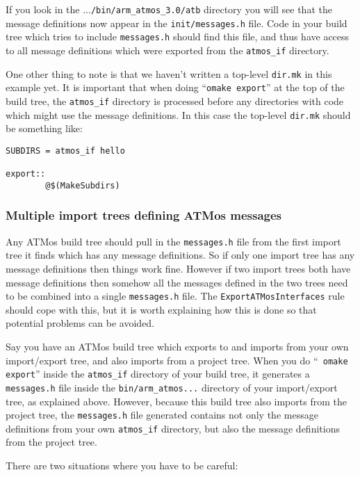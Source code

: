 \documentclass[11pt,twoside,onecolumn]{article}
\begin{document}
If you look in the ...\verb|/bin/arm_atmos_3.0/atb| directory you will see that
the message definitions now appear in the \verb|init/messages.h| file.  Code in
your build tree which tries to include \verb|messages.h| should find this file,
and thus have access to all message definitions which were exported from the
\verb|atmos_if| directory.

One other thing to note is that we haven't written a top-level {\tt dir.mk} in
this example yet.  It is important that when doing ``{\tt omake export}'' at
the top of the build tree, the \verb|atmos_if| directory is processed before
any directories with code which might use the message definitions.  In this
case the top-level {\tt dir.mk} should be something like:

{\small \begin{verbatim}
SUBDIRS = atmos_if hello

export::
        @$(MakeSubdirs)
\end{verbatim}}

\subsubsection{Multiple import trees defining ATMos messages}

Any ATMos build tree should pull in the \verb|messages.h| file from the first
import tree it finds which has any message definitions.  So if only one import
tree has any message definitions then things work fine.  However if two import
trees both have message definitions then somehow all the messages defined in
the two trees need to be combined into a single \verb|messages.h| file.  The
{\tt ExportATMosInterfaces} rule should cope with this, but it is worth
explaining how this is done so that potential problems can be avoided.

Say you have an ATMos build tree which exports to and imports from your own
import/export tree, and also imports from a project tree.  When you do ``{\tt
omake export}'' inside the \verb|atmos_if| directory of your build tree, it
generates a {\tt messages.h} file inside the \verb|bin/arm_atmos...| directory
of your import/export tree, as explained above.  However, because this build
tree also imports from the project tree, the {\tt messages.h} file generated
contains not only the message definitions from your own \verb|atmos_if|
directory, but also the message definitions from the project tree.

There are two situations where you have to be careful:
\end{document}

